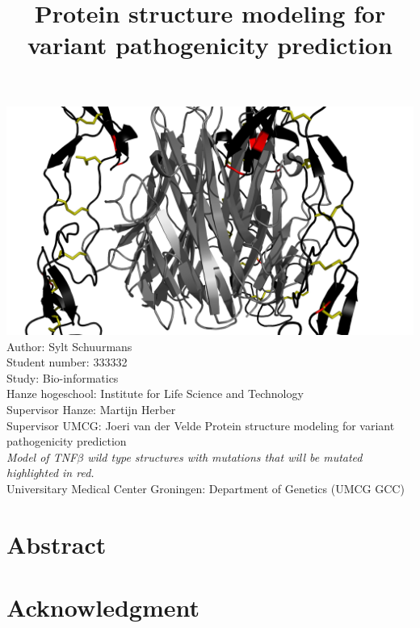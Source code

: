 \documentclass[10pt]{article}
\title{Protein structure modeling for variant pathogenicity prediction}
\begin{document}
	\maketitle
	\includegraphics[width=\textwidth]{Relax_Pymol_Images/TNFB_wild}
	\vfill
	\noindent
	Author: Sylt Schuurmans\\
	Student number: 333332\\
	Study: Bio-informatics\\
	Hanze hogeschool: Institute for Life Science and Technology\\
	Supervisor Hanze: Martijn Herber\\
	Supervisor UMCG: Joeri van der Velde
	\newpage
	\vspace*{\fill}
	\noindent
	Protein structure modeling for variant pathogenicity prediction\\
	\textit{Model of TNF$\beta$ wild type structures with mutations that will be mutated highlighted in red.}\\
	Universitary Medical Center Groningen: Department of Genetics (UMCG GCC)\\
	\newpage
	
	\section*{Abstract}
	
	\label{section:Chap_Introduction}
	\newpage
	
	\section*{Acknowledgment}
	
	\newpage
	
\end{document}
